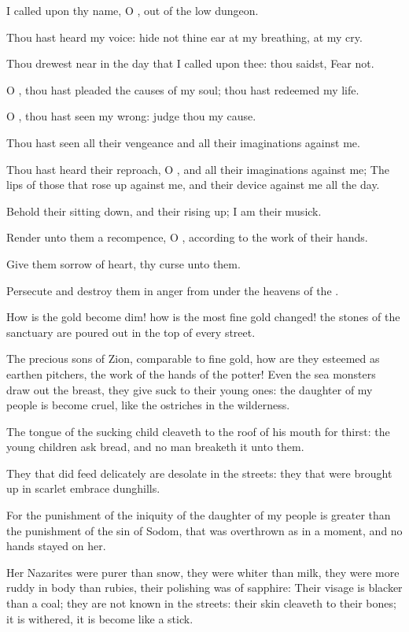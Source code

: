 \Verse I called upon thy name, O \LORD, out of the low dungeon.

\Verse Thou hast heard my voice: hide not thine ear at my breathing, at my cry.

\Verse Thou drewest near in the day that I called upon thee: thou saidst, Fear not.

\Verse O \LORD, thou hast pleaded the causes of my soul; thou hast redeemed my life.

\Verse O \LORD, thou hast seen my wrong: judge thou my cause.

\Verse Thou hast seen all their vengeance and all their imaginations against me.

\Verse Thou hast heard their reproach, O \LORD, and all their imaginations against me; \Verse The lips of those that rose up against me, and their device against me all the day.

\Verse Behold their sitting down, and their rising up; I am their musick.

\Verse Render unto them a recompence, O \LORD, according to the work of their hands.

\Verse Give them sorrow of heart, thy curse unto them.

\Verse Persecute and destroy them in anger from under the heavens of the \LORD.


\Chapter
\Verse How is the gold become dim! how is the most fine gold changed! the stones of the sanctuary are poured out in the top of every street.

\Verse The precious sons of Zion, comparable to fine gold, how are they esteemed as earthen pitchers, the work of the hands of the potter!  \Verse Even the sea monsters draw out the breast, they give suck to their young ones: the daughter of my people is become cruel, like the ostriches in the wilderness.

\Verse The tongue of the sucking child cleaveth to the roof of his mouth for thirst: the young children ask bread, and no man breaketh it unto them.

\Verse They that did feed delicately are desolate in the streets: they that were brought up in scarlet embrace dunghills.

\Verse For the punishment of the iniquity of the daughter of my people is greater than the punishment of the sin of Sodom, that was overthrown as in a moment, and no hands stayed on her.

\Verse Her Nazarites were purer than snow, they were whiter than milk, they were more ruddy in body than rubies, their polishing was of sapphire: \Verse Their visage is blacker than a coal; they are not known in the streets: their skin cleaveth to their bones; it is withered, it is become like a stick.

